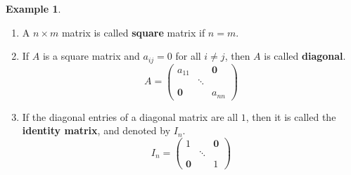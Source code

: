 \documentclass[t]{beamer}
\theoremstyle{plain}
\theoremstyle{definition}
\newtheorem{exmp}[thm]{Example}
\begin{document}
\begin{frame}
\begin{exmp}\*
\begin{enumerate}
	\item A $n\times m$ matrix is called \textbf{square} matrix if $n=m$.
	\item If $A$ is a square matrix and $a_{ij}=0$ for all $i\neq j$, then $A$ is called \textbf{diagonal}.
	$$A = \begin{pmatrix}
	a_{11} &  & \mathbf 0 \\
	& \ddots & \\
	\mathbf 0 & & a_{nn}
	\end{pmatrix}$$
	\item If the diagonal entries of a diagonal matrix are all $1$, then it is called the \textbf{identity matrix}, and denoted by $I_n$.
	$$I_n = \begin{pmatrix}
	1 &  & \mathbf 0 \\
	& \ddots & \\
	\mathbf 0 & & 1
	\end{pmatrix}$$
\end{enumerate}
\end{exmp}
\end{frame}
\end{document}
